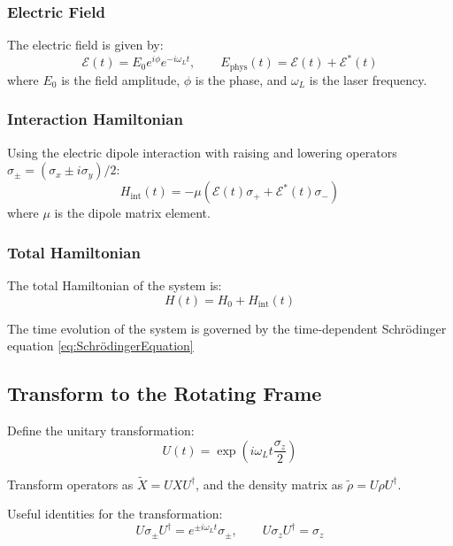 \subsubsection{Electric Field}
The electric field is given by:
\begin{equation}
	\mathcal{E}(t) = E_0 e^{i\phi} e^{-i\omega_L t}, \qquad
	E_{\text{phys}}(t) = \mathcal{E}(t) + \mathcal{E}^*(t)
	\label{eq:ElectricFieldComplex}
\end{equation}
where \(E_0\) is the field amplitude, \(\phi\) is the phase, and \(\omega_L\) is the laser frequency.

\subsubsection{Interaction Hamiltonian}
Using the electric dipole interaction with raising and lowering operators \(\sigma_\pm = (\sigma_x \pm i\sigma_y)/2\):
\begin{equation}
	H_{\text{int}}(t) = -\mu \left( \mathcal{E}(t) \sigma_+ + \mathcal{E}^*(t) \sigma_- \right)
	\label{eq:InteractionHamiltonianDipole}
\end{equation}
where \(\mu\) is the dipole matrix element.

\subsubsection{Total Hamiltonian}
The total Hamiltonian of the system is:
\begin{equation}
	H(t) = H_0 + H_{\text{int}}(t)
	\label{eq:TotalHamiltonian}
\end{equation}

The time evolution of the system is governed by the time-dependent Schrödinger equation \eqref{eq:SchrödingerEquation}

\subsection{Transform to the Rotating Frame}

Define the unitary transformation:
\begin{equation}
	U(t) = \exp\left(i \omega_L t \frac{\sigma_z}{2}\right)
	\label{eq:UnitaryRotatingFrame}
\end{equation}

Transform operators as \(\tilde{X} = U X U^\dagger\), and the density matrix as \(\tilde{\rho} = U \rho U^\dagger\).

Useful identities for the transformation:
\begin{equation}
	U \sigma_\pm U^\dagger = e^{\pm i \omega_L t} \sigma_\pm, \qquad
	U \sigma_z U^\dagger = \sigma_z
	\label{eq:TransformationIdentities}
\end{equation}

